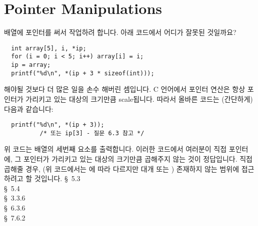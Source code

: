\section{Pointer Manipulations}
\begin{faq}
         배열에 포인터를 써서 작업하려 합니다.
        아래 코드에서 어디가 잘못된 것일까요?
\begin{verbatim}
  int array[5], i, *ip;
  for (i = 0; i < 5; i++) array[i] = i;
  ip = array;
  printf("%d\n", *(ip + 3 * sizeof(int)));
\end{verbatim}
\A
        해야될 것보다 더 많은 일을 손수 해버린 셈입니다. C 언어에서 포인터
        연산은 항상 포인터가 가리키고 있는 대상의 크기만큼 scale됩니다. 따라서
        올바른 코드는 (간단하게) 다음과 같습니다:
\begin{verbatim}
  printf("%d\n", *(ip + 3)); 
          /* 또는 ip[3] - 질문 6.3 참고 */
\end{verbatim}
        위 코드는 배열의 세번째 요소를 출력합니다. 이러한 코드에서 여러분이 직접 포인터에,
        그 포인터가 가리키고 있는 대상의 크기만큼 곱해주지 않는 것이 정답입니다. 직접 곱해줄 경우,
        (위 코드에서는 에 따라 다르지만 대개  또는
        ) 존재하지 않는 범위에 접근하려고 할 것입니다.
\R
        \cite{kr1} \S\ 5.3  \\
        \cite{kr2} \S\ 5.4  \\
        \cite{ansi} \S\ 3.3.6 \\
        \cite{c89} \S\ 6.3.6 \\
        \cite{hs} \S\ 7.6.2         
\end{faq}

